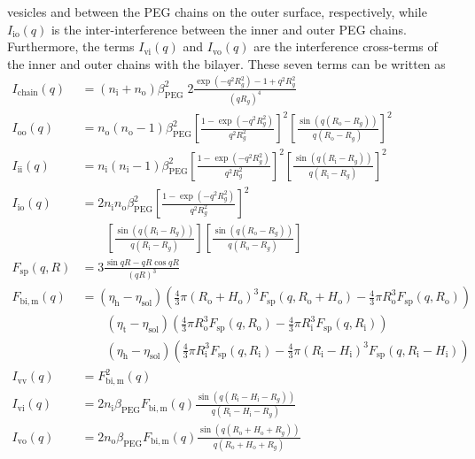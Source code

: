 vesicles and between the PEG chains on the outer surface,
respectively, while $ I_\mathrm{io}(q)$ is the inter-interference between the
inner and outer PEG chains. Furthermore, the terms $I_\mathrm{vi}(q)$ and $I_\mathrm{vo}(q)$ are the interference
cross-terms of the inner and outer chains with the bilayer.
These seven terms can be written as
\begin{align}
 I_\mathrm{chain}(q) &= (n_\mathrm{i}+n_\mathrm{o})\beta_\mathrm{PEG}^2 \; 2 \frac{\exp\left(-q^2R_g^2\right)-1+q^2R_g^2}{(qR_g)^4} \label{eq:vesiclePEG7chain}\\
 I_\mathrm{oo}(q) &= n_\mathrm{o}(n_\mathrm{o}-1)\beta_\mathrm{PEG}^2 \left[\frac{1-\exp\left(-q^2R_g^2\right)}{q^2R_g^2}\right]^2\left[\frac{\sin\left(q(R_\mathrm{o}-R_g)\right)}{q(R_\mathrm{o}-R_g)}\right]^2 \label{eq:vesiclePEG7oo}\\
 I_\mathrm{ii}(q) &=  n_\mathrm{i}(n_\mathrm{i}-1)\beta_\mathrm{PEG}^2 \left[\frac{1-\exp\left(-q^2R_g^2\right)}{q^2R_g^2}\right]^2\left[\frac{\sin\left(q(R_\mathrm{i}-R_g)\right)}{q(R_\mathrm{i}-R_g)}\right]^2 \label{eq:vesiclePEG7ii}\\
  I_\mathrm{io}(q) &= 2 n_\mathrm{i}n_\mathrm{o}\beta_\mathrm{PEG}^2 \left[\frac{1-\exp\left(-q^2R_g^2\right)}{q^2R_g^2}\right]^2 \nonumber \\
  &\qquad \left[\frac{\sin\left(q(R_\mathrm{i}-R_g)\right)}{q(R_\mathrm{i}-R_g)}\right] \left[\frac{\sin\left(q(R_\mathrm{o}-R_g)\right)}{q(R_\mathrm{o}-R_g)}\right]
 \label{eq:vesiclePEG7io}\\
 F_\mathrm{sp}(q,R) &= 3\frac{\sin qR - qR\cos qR}{(qR)^3} \nonumber \\
 F_\mathrm{bi,m}(q) &= (\eta_\mathrm{h}-\eta_\mathrm{sol})\left( \frac43\pi (R_\mathrm{o}+H_\mathrm{o})^3 F_\mathrm{sp}(q,R_\mathrm{o}+H_\mathrm{o}) -  \frac43\pi R_\mathrm{o}^3 F_\mathrm{sp}(q,R_\mathrm{o}) \right) \nonumber \\
 & \qquad (\eta_\mathrm{t}-\eta_\mathrm{sol}) \left(\frac43\pi R_\mathrm{o}^3 F_\mathrm{sp}(q,R_\mathrm{o}) - \frac43\pi R_\mathrm{i}^3 F_\mathrm{sp}(q,R_\mathrm{i}) \right) \nonumber \\
 & \qquad (\eta_\mathrm{h}-\eta_\mathrm{sol}) \left(\frac43\pi R_\mathrm{i}^3 F_\mathrm{sp}(q,R_\mathrm{i}) - \frac43\pi (R_\mathrm{i}-H_\mathrm{i})^3 F_\mathrm{sp}(q,R_\mathrm{i}-H_\mathrm{i})\right) \nonumber \\
 I_\mathrm{vv}(q) &= F_\mathrm{bi,m}^2(q) \label{eq:vesiclePEG7vv} \\
 I_\mathrm{vi}(q) &= 2 n_\mathrm{i}\beta_\mathrm{PEG} F_\mathrm{bi,m}(q) \frac{\sin\left(q(R_\mathrm{i}-H_\mathrm{i}-R_g)\right)}{q(R_\mathrm{i}-H_\mathrm{i}-R_g)} \label{eq:vesiclePEG7vi} \\
 I_\mathrm{vo}(q) &= 2 n_\mathrm{o}\beta_\mathrm{PEG} F_\mathrm{bi,m}(q) \frac{\sin\left(q(R_\mathrm{o}+H_\mathrm{o}+R_g)\right)}{q(R_\mathrm{o}+H_\mathrm{o}+R_g)} \label{eq:vesiclePEG7vo} \\
\end{align}
